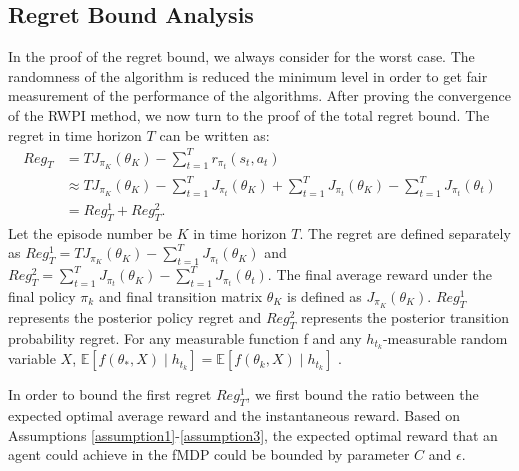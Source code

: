 \documentclass{article}
\theoremstyle{plain}
\newtheorem{theorem}{Theorem}[section]
\theoremstyle{definition}
\theoremstyle{remark}
\begin{document}
\subsection{Regret Bound Analysis}
In the proof of the regret bound, we always consider for the worst case. The randomness of the algorithm is reduced the minimum level in order to get fair measurement of the performance of the algorithms. After proving the convergence of the RWPI method, we now turn to the proof of the total regret bound. The regret in time horizon $T$ can be written as:
\begin{equation}
\begin{aligned}
Reg_{T} &= TJ_{\pi_{K}}( \theta_{K}) - \sum_{t = 1}^{T}r_{\pi_{t}}(s_{t},a_{t})\\
&\approx TJ_{\pi_{K}}(\theta_{K}) - \sum_{t=1}^{T}J_{\pi_{t}}(\theta_{K}) + \sum_{t=1}^{T}J_{\pi_{t}}(\theta_{K}) - \sum_{t = 1}^{T}J_{\pi_{t}}(\theta_{t})\\
&= Reg_{T}^{1} + Reg_{T}^{2}.
\end{aligned}
\end{equation}
Let the episode number be $K$ in time horizon $T$. The regret are defined separately as $Reg_{T}^{1} = TJ_{\pi_{K}}(\theta_{K}) - \sum_{t=1}^{T}J_{\pi_{t}}(\theta_{K})$ and $Reg_{T}^{2} = \sum_{t=1}^{T}J_{\pi_{t}}(\theta_{K}) - \sum_{t = 1}^{T}J_{\pi_{t}}(\theta_{t})$. The final average reward under the final policy $\pi_{k}$ and final transition matrix $\theta_{K}$ is defined as $J_{\pi_{K}}(\theta_{K})$. $Reg_{T}^{1}$ represents the posterior policy regret and $Reg_{T}^{2}$ represents the posterior transition probability regret. For any measurable function f and any $h_{t_{k}}$-measurable random variable $X$, $\mathbb{E}\left[f\left(\theta_{*}, X\right) \mid h_{t_{k}}\right]=\mathbb{E}\left[f\left(\theta_{k}, X\right) \mid h_{t_{k}}\right]$ \citep{osband2013more}.

In order to bound the first regret $Reg_{T}^{1}$, we first bound the ratio between the expected optimal average reward and the instantaneous reward. Based on Assumptions \ref{assumption1}-\ref{assumption3}, the expected optimal reward that an agent could achieve in the fMDP could be bounded by parameter $C$ and $\epsilon$.

\end{document}
